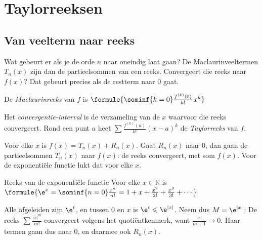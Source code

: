 
\begin{oefeningen}
\end{oefeningen}

\section{Taylorreeksen}

\subsection{Van veelterm naar reeks}

Wat gebeurt er als je de orde $n$ naar oneindig laat gaan? De Maclaurinveeltermen $T_n(x)$ zijn dan de partieelsommen van een reeks. Convergeert die reeks naar $f(x)$? Dat gebeurt precies als de restterm naar 0 gaat.

\begin{theorie}
De \emph{Maclaurinreeks} van $f$ is \quad $\formule{\sominf{k=0} \frac{f^{(k)}(0)}{k!}\,x^k}$

\vspace{1mm}
Het \emph{convergentie-interval} is de verzameling van de $x$ waarvoor die reeks convergeert. Rond een punt $a$ heet $\sum \tfrac{f^{(k)}(a)}{k!}(x - a)^k$ de \emph{Taylorreeks} van $f$.
\end{theorie}

Voor elke $x$ is $f(x) = T_n(x) + R_n(x)$. Gaat $R_n(x)$ naar 0, dan gaan de partieelsommen $T_n(x)$ naar $f(x)$: de reeks convergeert, met som $f(x)$. Voor de exponentiële functie lukt dat voor elke $x$.

\begin{theorie}
\begin{stelling}{Reeks van de exponentiële functie}
Voor elke $x \in \mathbb{R}$ is \quad $\formule{\e^x = \sominf{n=0} \frac{x^n}{n!} = 1 + x + \frac{x^2}{2!} + \frac{x^3}{3!} + \cdots}$
\end{stelling}

\begin{bewijs}
Alle afgeleiden zijn $\e^t$, en tussen 0 en $x$ is $\e^t \leqslant \e^{|x|}$. Neem dus $M = \e^{|x|}$:
De reeks $\sum \tfrac{|x|^m}{m!}$ convergeert volgens het quotiëntkenmerk, want $\tfrac{|x|}{m+1} \to 0$. Haar termen gaan dus naar 0, en daarmee ook $R_n(x)$.
\end{bewijs}
\end{theorie}

